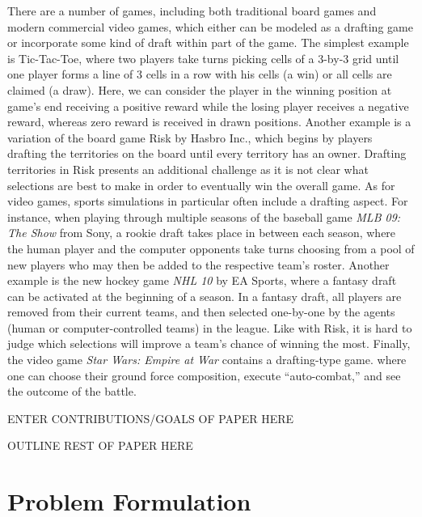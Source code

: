 \documentclass[letterpaper]{article}
\numberwithin{equation}{section}
\numberwithin{theorem}{section}
\numberwithin{lemma}{section}
\numberwithin{df}{section}
\begin{document}
There are a number of games, including both traditional board games and modern commercial video games, which either can be modeled as a drafting game or incorporate some kind of draft within part of the game.  The simplest example is Tic-Tac-Toe, where two players take turns picking cells of a 3-by-3 grid until one player forms a line of 3 cells in a row with his cells (a win) or all cells are claimed (a draw).  Here, we can consider the player in the winning position at game's end receiving a positive reward while the losing player receives a negative reward, whereas zero reward is received in drawn positions.  Another example is a variation of the board game Risk by Hasbro Inc., which begins by players drafting the territories on the board until every territory has an owner.  Drafting territories in Risk presents an additional challenge as it is not clear what selections are best to make in order to eventually win the overall game.  As for video games, sports simulations in particular often include a drafting aspect.  For instance, when playing through multiple seasons of the baseball game \textit{MLB 09: The Show} from Sony, a rookie draft takes place in between each season, where the human player and the computer opponents take turns choosing from a pool of new players who may then be added to the respective team's roster.  Another example is the new hockey game \textit{NHL 10} by EA Sports, where a fantasy draft can be activated at the beginning of a season.  In a fantasy draft, all players are removed from their current teams, and then selected one-by-one by the agents (human or computer-controlled teams) in the league.  Like with Risk, it is hard to judge which selections will improve a team's chance of winning the most.  Finally, the video game \textit{Star Wars: Empire at War} contains a drafting-type game. where one can choose their ground force composition, execute ``auto-combat,'' and see the outcome of the battle.

ENTER CONTRIBUTIONS/GOALS OF PAPER HERE

OUTLINE REST OF PAPER HERE

\section{Problem Formulation}
\label{sec:Prob}
\end{document}
